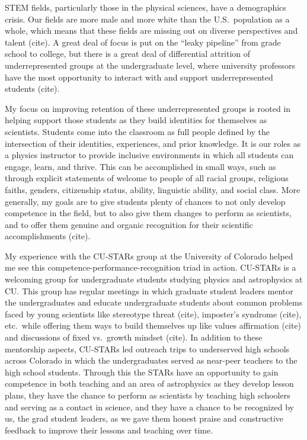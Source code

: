 \documentclass[11pt]{article}
\begin{document}
\thispagestyle{fancy}

STEM fields, particularly those in the physical sciences, have a demographics crisis. 
Our fields are more male and more white than the U.S.~population as a whole, which means that these fields are missing out on diverse perspectives and talent (cite). 
A great deal of focus is put on the “leaky pipeline” from grade school to college, but there is a great deal of differential attrition of underrepresented groups at the undergraduate level, where university professors have the most opportunity to interact with and support underrepresented students (cite). 

My focus on improving retention of these underrepresented groups is rooted in helping support those students as they build identities for themselves as scientists. 
Students come into the classroom as full people defined by the intersection of their identities, experiences, and prior knowledge. 
It is our roles as a physics instructor to provide inclusive environments in which all students can engage, learn, and thrive. 
This can be accomplished in small ways, such as through explicit statements of welcome to people of all racial groups, religious faiths, genders, citizenship status, ability, linguistic ability, and social class. 
More generally, my goals are to give students plenty of chances to not only develop competence in the field, but to also give them changes to perform as scientists, and to offer them genuine and organic recognition for their scientific accomplishments (cite).

My experience with the CU-STARs group at the University of Colorado helped me see this competence-performance-recognition triad in action. 
CU-STARs is a welcoming group for undergraduate students studying physics and astrophysics at CU. 
This group has regular meetings in which graduate student leaders mentor the undergraduates and educate undergraduate students about common problems faced by young scientists like stereotype threat (cite), imposter’s syndrome (cite), etc.~while offering them ways to build themselves up like values affirmation (cite) and discussions of fixed vs.~growth mindset (cite). 
In addition to these mentorship aspects, CU-STARs led outreach trips to underserved high schools across Colorado in which the undergraduates served as near-peer teachers to the high school students. 
Through this the STARs have an opportunity to gain competence in both teaching and an area of astrophysics as they develop lesson plans, they have the chance to perform as scientists by teaching high schoolers and serving as a contact in science, and they have a chance to be recognized by us, the grad student leaders, as we gave them honest praise and constructive feedback to improve their lessons and teaching over time.
\end{document}
